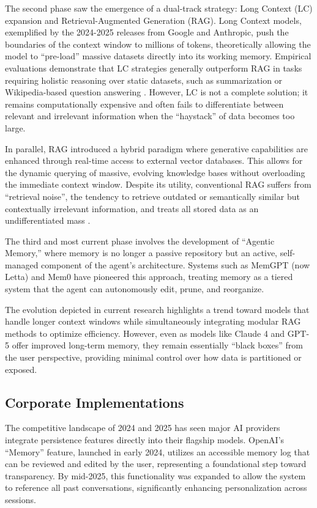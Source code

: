 ﻿\documentclass[12pt,a4paper]{article}
\begin{document}
The second phase saw the emergence of a dual-track strategy: Long Context (LC) expansion and Retrieval-Augmented Generation (RAG). Long Context models, exemplified by the 2024-2025 releases from Google \cite{reid2024gemini} and Anthropic, push the boundaries of the context window to millions of tokens, theoretically allowing the model to ``pre-load'' massive datasets directly into its working memory. Empirical evaluations demonstrate that LC strategies generally outperform RAG in tasks requiring holistic reasoning over static datasets, such as summarization or Wikipedia-based question answering \cite{li2024long}. However, LC is not a complete solution; it remains computationally expensive and often fails to differentiate between relevant and irrelevant information when the ``haystack'' of data becomes too large.

In parallel, RAG introduced a hybrid paradigm where generative capabilities are enhanced through real-time access to external vector databases. This allows for the dynamic querying of massive, evolving knowledge bases without overloading the immediate context window. Despite its utility, conventional RAG suffers from ``retrieval noise'', the tendency to retrieve outdated or semantically similar but contextually irrelevant information, and treats all stored data as an undifferentiated mass \cite{li2024retrieval}.

The third and most current phase involves the development of ``Agentic Memory,'' where memory is no longer a passive repository but an active, self-managed component of the agent's architecture. Systems such as MemGPT \cite{packer2023memgpt} (now Letta) and Mem0 \cite{chhikara2025mem0} have pioneered this approach, treating memory as a tiered system that the agent can autonomously edit, prune, and reorganize.

The evolution depicted in current research highlights a trend toward models that handle longer context windows while simultaneously integrating modular RAG methods to optimize efficiency. However, even as models like Claude 4 and GPT-5 offer improved long-term memory, they remain essentially ``black boxes'' from the user perspective, providing minimal control over how data is partitioned or exposed.

\subsection{Corporate Implementations}

The competitive landscape of 2024 and 2025 has seen major AI providers integrate persistence features directly into their flagship models. OpenAI's ``Memory'' feature, launched in early 2024, utilizes an accessible memory log that can be reviewed and edited by the user, representing a foundational step toward transparency. By mid-2025, this functionality was expanded to allow the system to reference all past conversations, significantly enhancing personalization across sessions.
\end{document}
